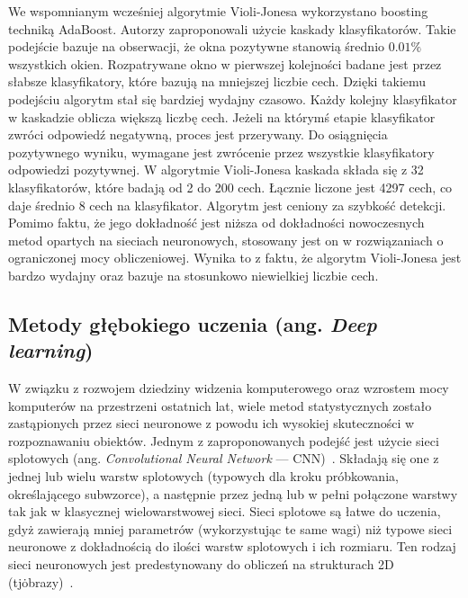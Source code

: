 We wspomnianym wcześniej algorytmie Violi-Jonesa wykorzystano boosting techniką AdaBoost.
Autorzy zaproponowali użycie kaskady klasyfikatorów.
Takie podejście bazuje na obserwacji, że okna pozytywne stanowią średnio $0.01\%$ wszystkich okien.
Rozpatrywane okno w pierwszej kolejności badane jest przez słabsze klasyfikatory, które bazują na mniejszej liczbie cech.
Dzięki takiemu podejściu algorytm stał się bardziej wydajny czasowo.
Każdy kolejny klasyfikator w kaskadzie oblicza większą liczbę cech.
Jeżeli na którymś etapie klasyfikator zwróci odpowiedź negatywną, proces jest przerywany.
Do osiągnięcia pozytywnego wyniku, wymagane jest zwrócenie przez wszystkie klasyfikatory odpowiedzi pozytywnej.
W algorytmie Violi-Jonesa kaskada składa się z 32 klasyfikatorów, które badają od 2 do 200 cech.
Łącznie liczone jest 4297 cech, co daje średnio 8 cech na klasyfikator.
Algorytm jest ceniony za szybkość detekcji.
Pomimo faktu, że jego dokładność jest niższa od dokładności nowoczesnych metod opartych na sieciach neuronowych, stosowany jest on w rozwiązaniach o ograniczonej mocy obliczeniowej.
Wynika to z faktu, że algorytm Violi-Jonesa jest bardzo wydajny oraz bazuje na stosunkowo niewielkiej liczbie cech.

\subsection{Metody głębokiego uczenia (ang. \textit{Deep learning})}
W związku z rozwojem dziedziny widzenia komputerowego oraz wzrostem mocy komputerów na przestrzeni ostatnich lat, wiele metod statystycznych zostało zastąpionych przez sieci neuronowe z powodu ich wysokiej skuteczności w rozpoznawaniu obiektów.
Jednym z zaproponowanych podejść jest użycie sieci splotowych (ang. \textit{Convolutional Neural Network} --- CNN)~\cite{cnn_detector}.
Składają się one z jednej lub wielu warstw splotowych (typowych dla kroku próbkowania, określającego subwzorce), a następnie przez jedną lub w pełni połączone warstwy tak jak w klasycznej wielowarstwowej sieci.
Sieci splotowe są łatwe do uczenia, gdyż zawierają mniej parametrów (wykorzystując te same wagi) niż typowe sieci neuronowe z dokładnością do ilości warstw splotowych i ich rozmiaru.
Ten rodzaj sieci neuronowych jest predestynowany do obliczeń na strukturach 2D (tj\. obrazy)~\cite{cnn_agh}.

